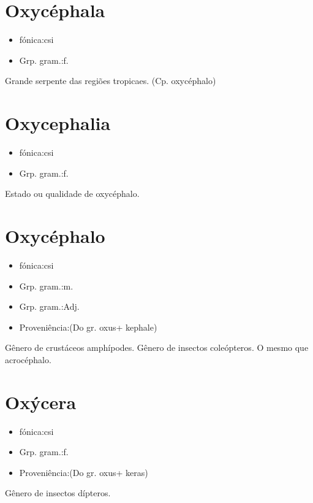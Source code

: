 \section{Oxycéphala}
\begin{itemize}
\item {fónica:csi}
\end{itemize}
\begin{itemize}
\item {Grp. gram.:f.}
\end{itemize}
Grande serpente das regiões tropicaes.
(Cp. \textunderscore oxycéphalo\textunderscore )
\section{Oxycephalia}
\begin{itemize}
\item {fónica:csi}
\end{itemize}
\begin{itemize}
\item {Grp. gram.:f.}
\end{itemize}
Estado ou qualidade de oxycéphalo.
\section{Oxycéphalo}
\begin{itemize}
\item {fónica:csi}
\end{itemize}
\begin{itemize}
\item {Grp. gram.:m.}
\end{itemize}
\begin{itemize}
\item {Grp. gram.:Adj.}
\end{itemize}
\begin{itemize}
\item {Proveniência:(Do gr. \textunderscore oxus\textunderscore  + \textunderscore kephale\textunderscore )}
\end{itemize}
Gênero de crustáceos amphípodes.
Gênero de insectos coleópteros.
O mesmo que \textunderscore acrocéphalo\textunderscore .
\section{Oxýcera}
\begin{itemize}
\item {fónica:csi}
\end{itemize}
\begin{itemize}
\item {Grp. gram.:f.}
\end{itemize}
\begin{itemize}
\item {Proveniência:(Do gr. \textunderscore oxus\textunderscore  + \textunderscore keras\textunderscore )}
\end{itemize}
Gênero de insectos dípteros.
